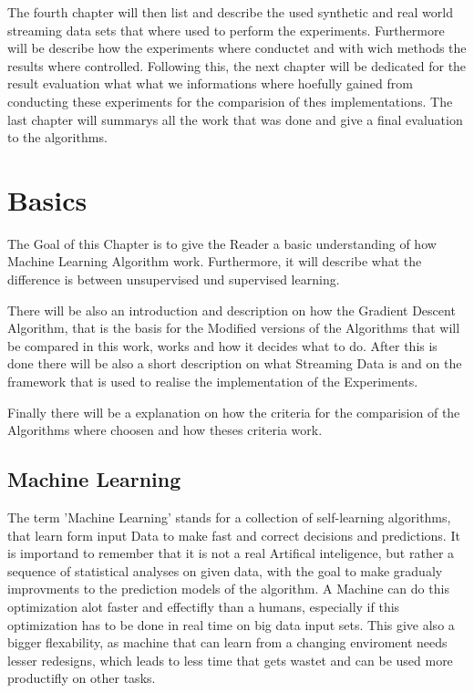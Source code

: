 \documentclass[12pt,oneside,a4paper,parskip]{scrbook}
\begin{document}
The fourth chapter will then list and describe the used synthetic and real world streaming data sets that where used to 
perform the experiments.
Furthermore will be describe how the experiments where conductet and with wich methods the results where controlled.
Following this, the next chapter will be dedicated for the result evaluation what what we informations where hoefully gained
from conducting these experiments for the comparision of thes implementations.
The last chapter will summarys all the work that was done and give a final evaluation to the algorithms.

\chapter{Basics}
The Goal of this Chapter is to give the Reader a basic understanding of how Machine Learning Algorithm work. 
Furthermore, it will describe what the difference is between unsupervised und supervised learning. 

There will be also an introduction and description on how the Gradient Descent Algorithm, that is the basis for the 
Modified versions of the Algorithms that will be compared in this work, works and how it decides what to do. 
After this is done there will be also a short description on what Streaming Data is and on the framework that is used to 
realise the implementation of the Experiments.

Finally there will be a explanation on how the criteria for the comparision of the Algorithms where choosen and how 
theses criteria work.

\section{Machine Learning}

The term 'Machine Learning' stands for a collection of self-learning algorithms, that learn form input Data to make 
fast and correct decisions and predictions. It is importand to remember that it is not a real Artifical inteligence, 
but rather a sequence of statistical analyses on given data, with the goal to make gradualy improvments to the prediction 
models of the algorithm.  
A Machine can do this optimization alot faster and effectifly than a humans, especially if this optimization has to be 
done in real time on big data input sets. This give also a bigger flexability, as machine that can learn from a changing 
enviroment needs lesser redesigns, which leads to less time that gets wastet and can be used more productifly on other 
tasks. 
\end{document}
